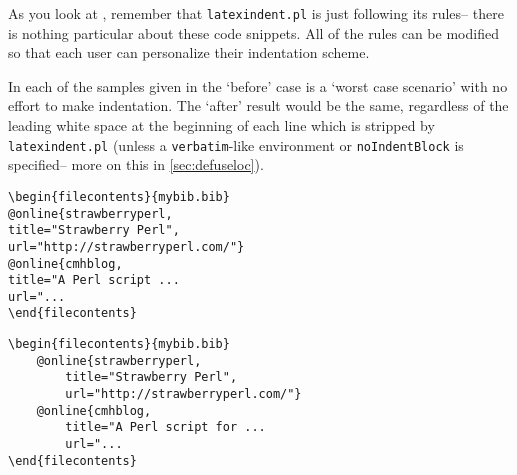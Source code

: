 As you look at , remember
that \lstinline!latexindent.pl! is just following its rules-- there is nothing 
particular about these code snippets. All of the rules can be modified 
so that each user can personalize their indentation scheme. 

In each of the samples given in 
the `before' case is a `worst case scenario' with no effort to make indentation. The `after'
result would be the same, regardless of the leading white space at the beginning of 
each line which is stripped by \lstinline!latexindent.pl! (unless a \lstinline!verbatim!-like
environment or \lstinline!noIndentBlock! is specified-- more on this in \cref{sec:defuseloc}).

\begin{adjustwidth}{-2cm}{2cm}
	\begin{minipage}{.5\textwidth}
		\begin{lstlisting}[style=demo,caption={\lstinline!filecontents! before},label={lst:filecontentsbefore}]
\begin{filecontents}{mybib.bib}
@online{strawberryperl,
title="Strawberry Perl",
url="http://strawberryperl.com/"}
@online{cmhblog,
title="A Perl script ...
url="...
\end{filecontents}
		\end{lstlisting}
	\end{minipage}%
	\begin{minipage}{.5\textwidth}
		\begin{lstlisting}[style=demo,caption={\lstinline!filecontents! after}]
\begin{filecontents}{mybib.bib}
	@online{strawberryperl,
		title="Strawberry Perl",
		url="http://strawberryperl.com/"}
	@online{cmhblog,
		title="A Perl script for ...
		url="...
\end{filecontents}
		\end{lstlisting}
	\end{minipage}
												 	 	 	 	 				

\end{adjustwidth}
